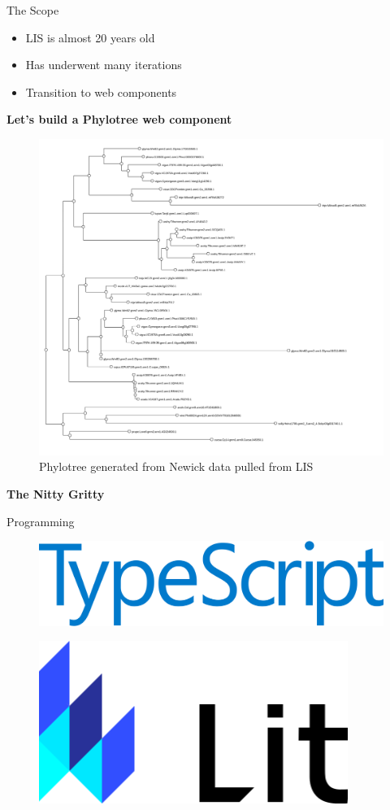 \documentclass[aspectratio=169]{beamer}
\begin{document}
\begin{frame}{The Scope}
	\begin{itemize}
		\item<1->LIS is almost 20 years old
		\item<2->Has underwent many iterations
		\item<3->Transition to web components
	\end{itemize}
	\end{frame}
	\begin{frame}
		\large{\textbf{Let's build a Phylotree web component}}
		\begin{figure}
			\centering
			\includegraphics[height=0.5\linewidth]{imgs/black-and-white-lis-vertical-tree.png}
			\caption{Phylotree generated from Newick data pulled from LIS}
		\end{figure}	\end{frame}
	
	\begin{frame}
		\large{\textbf{The Nitty Gritty}}
		\end{frame}
		\begin{frame}{Programming}
			\only<1-> {
				\begin{figure}
					\includegraphics[height=0.2\linewidth]{imgs/typescript-logo.png}
				\end{figure}
			}
			\only<2-> {
				\begin{figure}
					\includegraphics[height=0.2\linewidth]{imgs/lit-logo.png}
				\end{figure}
			}
		\end{frame}
		
\end{document}
